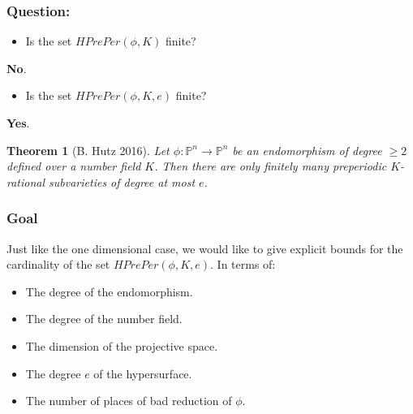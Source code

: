 \documentclass{beamer}
\def\jump{ \quad \\ \vspace{0.5cm} \pause}
\def\PP{{\mathbb P}}
\def\QQ{{\mathbb Q}}
\theoremstyle{thmstyle}
\newtheorem*{mythm}{Theorem}
\theoremstyle{mystyle}
\theoremstyle{qstnstyle}
\begin{document}
\begin{frame}
\frametitle{Question:}
\begin{itemize}
\item Is the set $HPrePer(\phi,K)$ finite? 
\end{itemize}
\pause \textbf{No}. 
\vspace{6mm}\pause

\begin{itemize}
\item Is the set $HPrePer(\phi,K,e)$ finite? 
\end{itemize}
\pause \textbf{Yes}. 
\vspace{6mm}\pause



\begin{mythm}[B. Hutz 2016]
Let $\phi : \PP^n \to \PP^n$ be an endomorphism of degree $\geq{2}$ defined over a number field $K$. Then there are only finitely many preperiodic $K$-rational subvarieties of degree at most $e$.
\end{mythm}
%

\end{frame}



\begin{frame}
\frametitle{Goal}
Just like the one dimensional case, we would like to give explicit bounds for the cardinality of the set $HPrePer(\phi,K,e)$. In terms of:\jump
\begin{itemize}
\item The degree of the endomorphism.
\vspace{2mm}
\item The degree of the number field.
\vspace{2mm}
\item The dimension of the projective space.
\vspace{2mm}
\item The degree $e$ of the hypersurface.
\vspace{2mm}
\item The number of places of bad reduction of $\phi$.
\end{itemize}


\end{frame}
\end{document}
